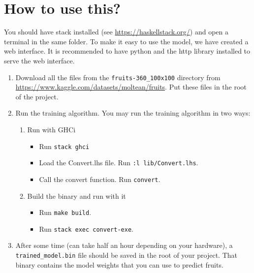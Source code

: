 \section{How to use this?}

You should have stack installed (see \url{https://haskellstack.org/}) and open a terminal in the same folder.
To make it easy to use the model, we have created a web interface. It is recommended to have python and the http library installed to serve the web interface.

\begin{enumerate}
  \item Download all the files from the \texttt{fruits-360\_100x100} directory from \url{https://www.kaggle.com/datasets/moltean/fruits}. Put these files in the root of the project.
  \item Run the training algorithm. You may run the training algorithm in two ways: 
  \begin{enumerate}
      \item Run with GHCi
        \begin{itemize}
          \item Run \verb|stack ghci| 
          \item Load the Convert.lhs file. Run \verb|:l lib/Convert.lhs|. 
          \item Call the convert function. Run \verb|convert|.
        \end{itemize}
      \item Build the binary and run with it
        \begin{itemize}
            \item Run \verb|make build|.
            \item Run \verb|stack exec convert-exe|.
        \end{itemize}
  \end{enumerate}
  \item After some time (can take half an hour depending on your hardware), a \texttt{trained\_model.bin} file should be saved in the root of your project. That binary contains the model weights that you can use to predict fruits.



\end{enumerate}
